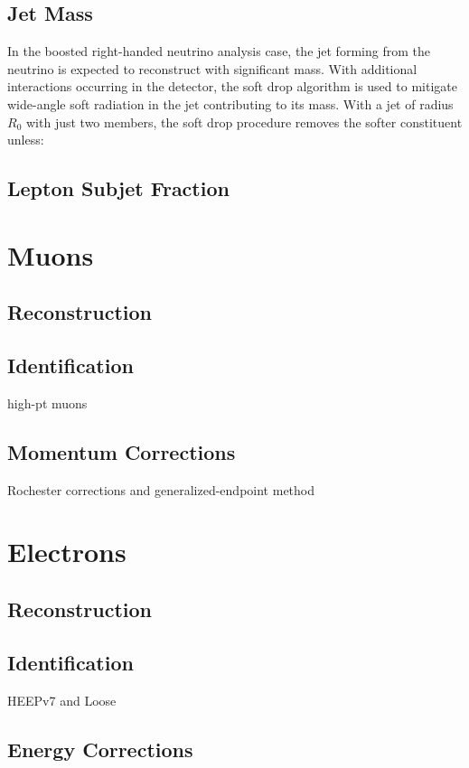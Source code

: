 \subsection{Jet Mass}
In the boosted right-handed neutrino analysis case, the jet forming from the neutrino is expected to reconstruct with significant mass. With additional interactions occurring in the detector, the soft drop algorithm is used to mitigate wide-angle soft radiation in the jet contributing to its mass. With a jet of radius \ensuremath{R_0} with just two members, the soft drop procedure removes the softer constituent unless:

\subsection{Lepton Subjet Fraction}

\section{Muons}
\subsection{Reconstruction}
\subsection{Identification}
high-pt muons
\subsection{Momentum Corrections}
Rochester corrections and generalized-endpoint method

\section{Electrons}
\subsection{Reconstruction}
\subsection{Identification}
HEEPv7 and Loose
\subsection{Energy Corrections}

